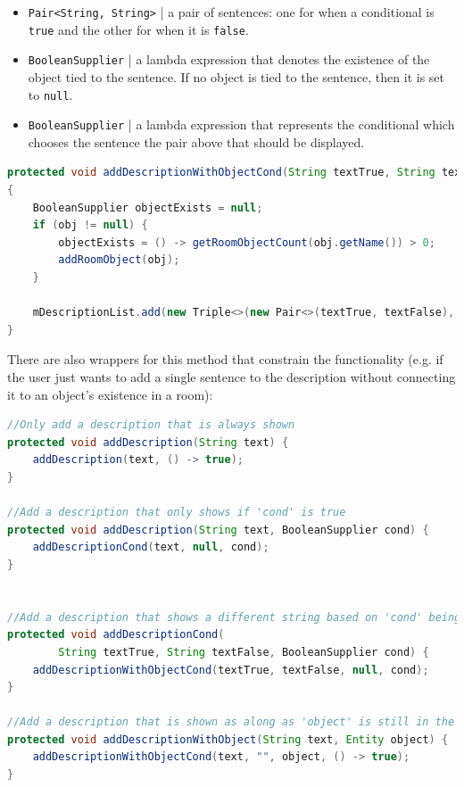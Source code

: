 \documentclass[11pt]{article}
\begin{document}
\begin{itemize}
\item \texttt{Pair<String, String>} | a pair of sentences: one for when a conditional is \texttt{true} and the other for when it is \texttt{false}.

\item \texttt{BooleanSupplier} | a lambda expression that denotes the existence of the object tied to the sentence. If no object is tied to the sentence, then it is set to \texttt{null}.

\item \texttt{BooleanSupplier} | a lambda expression that represents the conditional which chooses the sentence the pair above that should be displayed.
\end{itemize}

\begin{lstlisting}[language=Java, caption=Room::addDescriptionWithObjectCond(), label=lst:room-description-code]
protected void addDescriptionWithObjectCond(String textTrue, String textFalse, Entity obj, BooleanSupplier cond)
{
    BooleanSupplier objectExists = null;
    if (obj != null) {
        objectExists = () -> getRoomObjectCount(obj.getName()) > 0;
        addRoomObject(obj);
    }

    mDescriptionList.add(new Triple<>(new Pair<>(textTrue, textFalse), objectExists, cond));
}
\end{lstlisting}

There are also wrappers for this method that constrain the functionality (e.g. if the user just wants to add a single sentence to the description without connecting it to an object's existence in a room):

\begin{lstlisting}[language=Java, caption=addDescriptionWithObjectCond() wrappers, label=lst:room-description-wrappers]
//Only add a description that is always shown
protected void addDescription(String text) {
    addDescription(text, () -> true);
}

//Add a description that only shows if 'cond' is true
protected void addDescription(String text, BooleanSupplier cond) {
    addDescriptionCond(text, null, cond);
}


//Add a description that shows a different string based on 'cond' being true/false
protected void addDescriptionCond(
        String textTrue, String textFalse, BooleanSupplier cond) {
    addDescriptionWithObjectCond(textTrue, textFalse, null, cond);
}

//Add a description that is shown as along as 'object' is still in the room
protected void addDescriptionWithObject(String text, Entity object) {
    addDescriptionWithObjectCond(text, "", object, () -> true);
}
\end{lstlisting}
\end{document}
